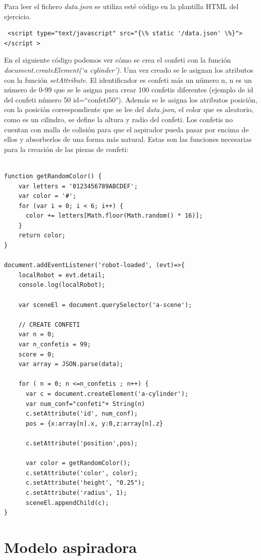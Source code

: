 Para leer el fichero \textit{data.json} se utiliza esté código en la plantilla HTML del ejercicio.
\begin{lstlisting}
 <script type="text/javascript" src="{\% static '/data.json' \%}"></script > 
 \end{lstlisting}


En el siguiente código podemos ver cómo se crea el confeti con la función \textit{document.createElement(`a\- cylinder')}. Una vez creado se le asignan los atributos con la función  \textit{setAttribute}.  El identificador es confeti más un número  n, n es un número de 0-99 que se le asigna para crear 100 confetis diferentes (ejemplo de id del confeti número 50   id=``confeti50"). Además se le asigna los atributos posición, con la posición correspondiente que se lee del \textit{data.json}, el color que es  aleatorio, como es un cilindro, se define la altura y radio del confeti.
Los confetis no cuentan con malla de colisión para que el aspirador pueda pasar por encima de ellos y absorberlos de una forma más natural.
Estas son las funciones necesarias para la creación de las piezas de confeti: 
\begin{lstlisting}

function getRandomColor() {
    var letters = '0123456789ABCDEF';
    var color = '#';
    for (var i = 0; i < 6; i++) {
      color += letters[Math.floor(Math.random() * 16)];
    }
    return color;
}

document.addEventListener('robot-loaded', (evt)=>{
    localRobot = evt.detail;
    console.log(localRobot);

    var sceneEl = document.querySelector('a-scene');

    // CREATE CONFETI
    var n = 0;
    var n_confetis = 99;
    score = 0;
    var array = JSON.parse(data);

    for ( n = 0; n <=n_confetis ; n++) {
      var c = document.createElement('a-cylinder');
      var num_conf="confeti"+ String(n)
      c.setAttribute('id', num_conf);
      pos = {x:array[n].x, y:0,z:array[n].z}
    
      c.setAttribute('position',pos);
    
      var color = getRandomColor();
      c.setAttribute('color', color);
      c.setAttribute('height', "0.25");
      c.setAttribute('radius', 1);
      sceneEl.appendChild(c);
}
\end{lstlisting}

\section{Modelo aspiradora}

